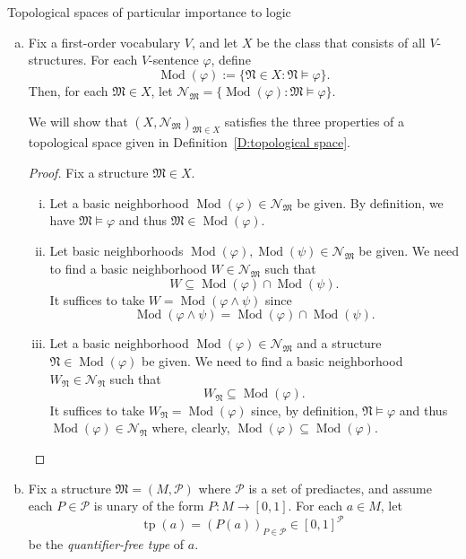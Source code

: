 \documentclass{scrartcl}
\DeclareMathOperator{\Mod}{Mod}
\begin{document}
\begin{example} Topological spaces of particular importance to logic
\label{E: logic topological spaces}

\begin{enumerate}[(a)]

\item Fix a first-order vocabulary $V$, and let $X$ be the class that consists of all $V$-structures. For each $V$-sentence $\varphi$, define 
\[
\Mod(\varphi):=\{\mathfrak{N}\in X \colon \mathfrak{N}\models \varphi\}\text{.}
\]
Then, for each $\mathfrak{M}\in X$, let $\mathscr{N}_\mathfrak{M} = \{ \Mod (\varphi): \mathfrak{M}\models \varphi \}$.

We will show that $(X,\mathscr{N}_\mathfrak{M})_{\mathfrak{M}\in X}$ satisfies the three properties of a topological space given in Definition~\ref{D:topological space}.

\begin{proof} Fix a structure $\mathfrak{M}\in X$.

\begin{enumerate}[i)]

\item Let a basic neighborhood $\Mod(\varphi) \in \mathscr{N}_\mathfrak{M}$ be given. By definition, we have $\mathfrak{M}\models \varphi$ and thus $\mathfrak{M}\in\Mod(\varphi)$.

\item Let basic neighborhoods $\Mod(\varphi), \Mod(\psi) \in \mathscr{N}_\mathfrak{M}$ be given.
We need to find a basic neighborhood $W\in \mathscr{N}_\mathfrak{M}$ such that \[W \subseteq \Mod(\varphi)\cap \Mod(\psi)\text{.}\]
It suffices to take $W = \Mod(\varphi\wedge \psi)$ since \[\Mod(\varphi\wedge \psi) = \Mod(\varphi)\cap \Mod(\psi)\text{.}\]

\item Let a basic neighborhood $\Mod(\varphi) \in \mathscr{N}_\mathfrak{M}$ and a structure $\mathfrak{N}\in \Mod(\varphi)$ be given.
We need to find a basic neighborhood $W_\mathfrak{N}\in \mathscr{N}_\mathfrak{N}$ such that \[W_\mathfrak{N} \subseteq \Mod(\varphi)\text{.}\]
It suffices to take $W_\mathfrak{N} = \Mod(\varphi)$ since, by definition, $\mathfrak{N}\models \varphi$ and thus $\Mod(\varphi)\in\mathscr{N}_\mathfrak{N}$ where, clearly, $\Mod(\varphi)\subseteq \Mod(\varphi)$.
\end{enumerate}
\end{proof}

\item Fix a structure $\mathfrak{M}=(M, \mathscr{P})$ where $\mathscr{P}$ is a set of prediactes, and assume each $P\in \mathscr{P}$ is unary of the form $P\colon M\to [0,1]$. For each $a\in M$, let 
\[
\operatorname{tp}(a) = (P(a))_{P\in \mathscr{P}}\in [0,1]^\mathscr{P}\
\]
be the \emph{quantifier-free type} of $a$.


\end{enumerate}
\end{example}
\end{document}

